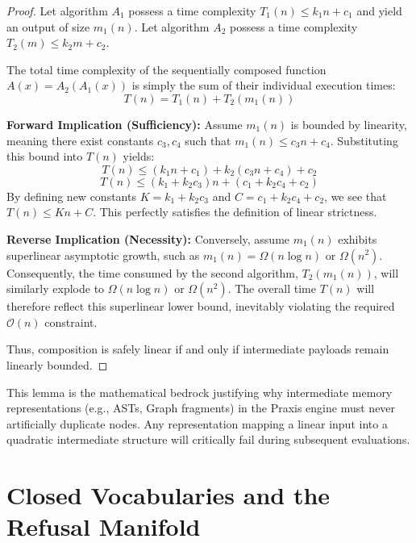 \begin{proof}
Let algorithm $A_1$ possess a time complexity $T_1(n) \le k_1 n + c_1$ and yield an output of size $m_1(n)$. 
Let algorithm $A_2$ possess a time complexity $T_2(m) \le k_2 m + c_2$.

The total time complexity of the sequentially composed function $A(x) = A_2(A_1(x))$ is simply the sum of their individual execution times:
\begin{equation}
T(n) = T_1(n) + T_2(m_1(n))
\end{equation}

\textbf{Forward Implication (Sufficiency):} Assume $m_1(n)$ is bounded by linearity, meaning there exist constants $c_3, c_4$ such that $m_1(n) \le c_3 n + c_4$. Substituting this bound into $T(n)$ yields:
\begin{equation}
T(n) \le (k_1 n + c_1) + k_2 (c_3 n + c_4) + c_2
\end{equation}
\begin{equation}
T(n) \le (k_1 + k_2 c_3) n + (c_1 + k_2 c_4 + c_2)
\end{equation}
By defining new constants $K = k_1 + k_2 c_3$ and $C = c_1 + k_2 c_4 + c_2$, we see that $T(n) \le K n + C$. This perfectly satisfies the definition of linear strictness.

\textbf{Reverse Implication (Necessity):} Conversely, assume $m_1(n)$ exhibits superlinear asymptotic growth, such as $m_1(n) = \Omega(n \log n)$ or $\Omega(n^2)$. Consequently, the time consumed by the second algorithm, $T_2(m_1(n))$, will similarly explode to $\Omega(n \log n)$ or $\Omega(n^2)$. The overall time $T(n)$ will therefore reflect this superlinear lower bound, inevitably violating the required $\mathcal{O}(n)$ constraint.

Thus, composition is safely linear if and only if intermediate payloads remain linearly bounded.
\end{proof}

This lemma is the mathematical bedrock justifying why intermediate memory representations (e.g., ASTs, Graph fragments) in the Praxis engine must never artificially duplicate nodes. Any representation mapping a linear input into a quadratic intermediate structure will critically fail during subsequent evaluations.

\section{Closed Vocabularies and the Refusal Manifold}

